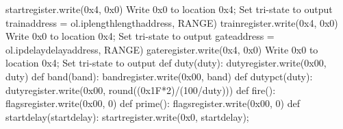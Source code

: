 {}
\markdownRendererSectionEnd \markdownRendererSectionBegin
{}\markdownRendererInterblockSeparator
{}startregister.write(0x4, 0x0) \markdownRendererHash{} Write 0x0 to location 0x4; Set tri-state to output\markdownRendererInterblockSeparator
{}trainaddress = ol.iplengthlength\markdownRendererUnderscore{}address, RANGE) \markdownRendererInterblockSeparator
{}
\markdownRendererSectionEnd \markdownRendererSectionBegin
{}\markdownRendererInterblockSeparator
{}trainregister.write(0x4, 0x0) \markdownRendererHash{} Write 0x0 to location 0x4; Set tri-state to output\markdownRendererInterblockSeparator
{}gateaddress = ol.ipdelaydelay\markdownRendererUnderscore{}address, RANGE) \markdownRendererInterblockSeparator
{}
\markdownRendererSectionEnd \markdownRendererSectionBegin
{}\markdownRendererInterblockSeparator
{}gateregister.write(0x4, 0x0) \markdownRendererHash{} Write 0x0 to location 0x4; Set tri-state to output\markdownRendererInterblockSeparator
{}def duty(duty): duty\markdownRendererUnderscore{}register.write(0x00, duty)\markdownRendererInterblockSeparator
{}def band(band): band\markdownRendererUnderscore{}register.write(0x00, band)\markdownRendererInterblockSeparator
{}def dutypct(duty): duty\markdownRendererUnderscore{}register.write(0x00, round((0x1F*2)/(100/duty)))\markdownRendererInterblockSeparator
{}def fire(): flagsregister.write(0x00, 0)\markdownRendererInterblockSeparator
{}def prime(): flagsregister.write(0x00, 0)\markdownRendererInterblockSeparator
{}def startdelay(startdelay): startregister.write(0x0, startdelay);\markdownRendererInterblockSeparator
